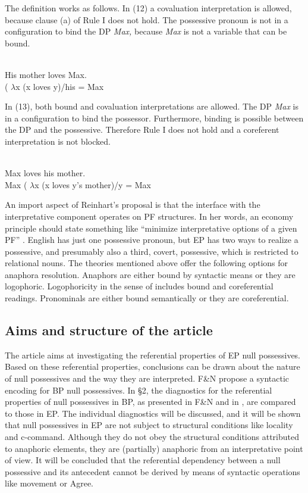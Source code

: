 \documentclass[output=paper]{langsci/langscibook}
\begin{document}
The definition works as follows. In (12) a covaluation interpretation is allowed, because clause (a) of Rule I does not hold. The possessive pronoun is not in a configuration to bind the DP \textit{Max,} because \textit{Max} is not a variable that can be bound.

\ea%
    \citep[186]{Reinhart2006}\\\label{ex:wein:12}
    His mother loves Max.\\ ( $\lambda $x (x loves y)\slash his = Max\\
\z

In (13), both bound and covaluation interpretations are allowed. The DP \textit{Max} is in a configuration to bind the possessor. Furthermore, binding is possible between the DP and the possessive. Therefore Rule I does not hold and a coreferent interpretation is not blocked.

\ea%
    \citep[186]{Reinhart2006}\\\label{ex:wein:13}
    Max loves his mother.\\
    Max ( $\lambda $x (x loves y’s mother)\slash y = Max\\
\z

An import aspect of Reinhart’s proposal is that the interface with the interpretative component operates on PF structures. In her words, an economy principle should state something like “minimize interpretative options of a given PF” \citep[103]{Reinhart2006}. English has just one possessive pronoun, but EP has two ways to realize a possessive, and presumably also a third, covert, possessive, which is restricted to relational nouns. The theories mentioned above offer the following options for anaphora resolution. Anaphors are either bound by syntactic means or they are logophoric. Logophoricity in the sense of \citet{Reuland2011} includes bound and coreferential readings. Pronominals are either bound semantically or they are coreferential.

\subsection{Aims and structure of the article}%

The article aims at investigating the referential properties of EP null possessives. Based on these referential properties, conclusions can be drawn about the nature of null possessives and the way they are interpreted. F\&N propose a syntactic encoding for BP null possessives. In §2, the diagnostics for the referential properties of null possessives in BP, as presented in F\&N and in \citet{Rodrigues2010}, are compared to those in EP. The individual diagnostics will be discussed, and it will be shown that null possessives in EP are not subject to structural conditions like locality and c-command. Although they do not obey the structural conditions attributed to anaphoric elements, they are (partially) anaphoric from an interpretative point of view. It will be concluded that the referential dependency between a null possessive and its antecedent cannot be derived by means of syntactic operations like movement or Agree.
\end{document}
